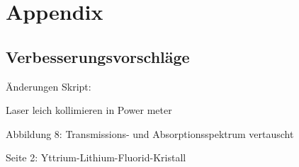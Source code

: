 \section{Appendix}

\subsection{Verbesserungsvorschläge}

Änderungen Skript:

Laser leich kollimieren in Power meter

Abbildung 8: Transmissions- und Absorptionsspektrum vertauscht

Seite 2: Yttrium-Lithium-Fluorid-Kristall